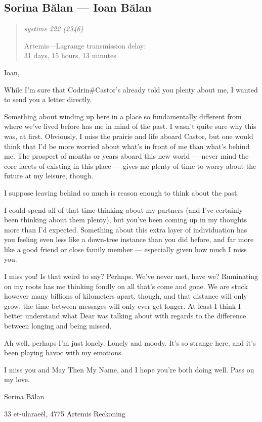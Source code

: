 \hypertarget{sorina-bux103lan-ioan-bux103lan}{%
\subsection{Sorina Bălan — Ioan Bălan}\label{sorina-bux103lan-ioan-bux103lan}}

\begin{quote}
\itshape
systime 222 (2346)

Artemis---Lagrange transmission delay:\\
31 days, 15 hours, 13 minutes
\end{quote}

Ioan,

While I'm sure that Codrin\#Castor's already told you plenty about me, I wanted to send you a letter directly.

Something about winding up here in a place so fundamentally different from where we've lived before has me in mind of the past. I wasn't quite sure why this was, at first. Obviously, I miss the prairie and life aboard Castor, but one would think that I'd be more worried about what's in front of me than what's behind me. The prospect of months or years aboard this new world — never mind the core facets of existing in this place — gives me plenty of time to worry about the future at my leisure, though.

I suppose leaving behind so much is reason enough to think about the past.

I could spend all of that time thinking about my partners (and I've certainly been thinking about them plenty), but you've been coming up in my thoughts more than I'd expected. Something about this extra layer of individuation has you feeling even less like a down-tree instance than you did before, and far more like a good friend or close family member — especially given how much I miss you.

I miss you! Is that weird to say? Perhaps. We've never met, have we? Ruminating on my roots has me thinking fondly on all that's come and gone. We are stuck however many billions of kilometers apart, though, and that distance will only grow, the time between messages will only ever get longer. At least I think I better understand what Dear was talking about with regards to the difference between longing and being missed.

Ah well, perhaps I'm just lonely. Lonely and moody. It's so strange here, and it's been playing havoc with my emotions.

I miss you and May Then My Name, and I hope you're both doing well. Pass on my love.

Sorina Bălan

33 et-ularaeël, 4775 Artemis Reckoning
